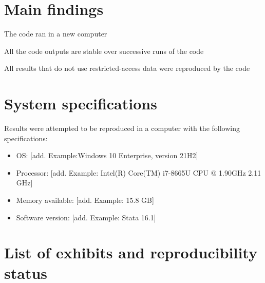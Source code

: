 \documentclass{tufte-handout}
\newcommand{\cmark}{\ding{51}}%
\newcommand{\xmark}{\ding{55}}%
\newcommand{\done}{\rlap{$\square$}{\raisebox{2pt}{\large\hspace{1pt}\cmark}}%
\hspace{-2.5pt}}
\newcommand{\pending}{\rlap{$\square$}{\large\hspace{1pt}\xmark}}
\begin{document}
\section{Main findings}
\label{main-findings}

\begin{todolist}


    \item[\done] The code ran in a new computer

    \item[\done] All the code outputs are stable over successive runs of the code

    \item[\done] All results that do not use restricted-access data were reproduced by the code
     
\end{todolist}

\section{System specifications}

Results were attempted to be reproduced in a computer with the following specifications:

\begin{itemize}
    \item OS: [add. Example:Windows 10 Enterprise, version 21H2]
    \item Processor: [add. Example: Intel(R) Core(TM) i7-8665U CPU @ 1.90GHz   2.11 GHz]
    \item Memory available: [add. Example: 15.8 GB]
    \item Software version: [add. Example: Stata 16.1]
\end{itemize}

\section{List of exhibits and reproducibility status}
\label{output-list}

\end{document}
